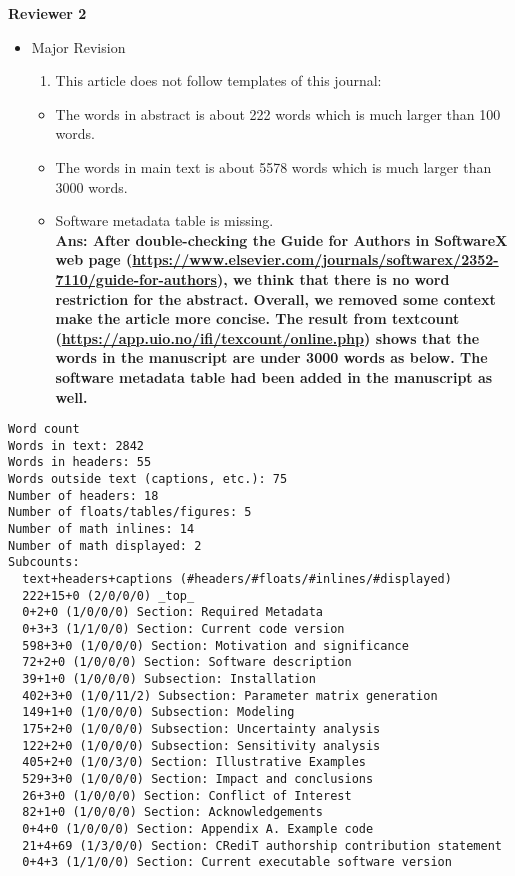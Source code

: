\documentclass[
]{article}
\providecommand{\tightlist}{%
  \setlength{\itemsep}{0pt}\setlength{\parskip}{0pt}}
\begin{document}
\textbf{Reviewer 2}

\begin{itemize}
\item
  Major Revision

  \begin{enumerate}
  \def\labelenumi{\arabic{enumi}.}
  \tightlist
  \item
    This article does not follow templates of this journal:
  \end{enumerate}

  \begin{itemize}
  \tightlist
  \item
    The words in abstract is about 222 words which is much larger than
    100 words.
  \item
    The words in main text is about 5578 words which is much larger than
    3000 words.
  \item
    Software metadata table is missing.\\
    \textbf{Ans: After double-checking the Guide for Authors in
    SoftwareX web page
    (\url{https://www.elsevier.com/journals/softwarex/2352-7110/guide-for-authors}),
    we think that there is no word restriction for the abstract.
    Overall, we removed some context make the article more concise. The
    result from textcount
    (\url{https://app.uio.no/ifi/texcount/online.php}) shows that the
    words in the manuscript are under 3000 words as below. The software
    metadata table had been added in the manuscript as well.}
  \end{itemize}
\end{itemize}

\begin{verbatim}
Word count
Words in text: 2842
Words in headers: 55
Words outside text (captions, etc.): 75
Number of headers: 18
Number of floats/tables/figures: 5
Number of math inlines: 14
Number of math displayed: 2
Subcounts:
  text+headers+captions (#headers/#floats/#inlines/#displayed)
  222+15+0 (2/0/0/0) _top_
  0+2+0 (1/0/0/0) Section: Required Metadata
  0+3+3 (1/1/0/0) Section: Current code version
  598+3+0 (1/0/0/0) Section: Motivation and significance
  72+2+0 (1/0/0/0) Section: Software description
  39+1+0 (1/0/0/0) Subsection: Installation
  402+3+0 (1/0/11/2) Subsection: Parameter matrix generation
  149+1+0 (1/0/0/0) Subsection: Modeling
  175+2+0 (1/0/0/0) Subsection: Uncertainty analysis
  122+2+0 (1/0/0/0) Subsection: Sensitivity analysis
  405+2+0 (1/0/3/0) Section: Illustrative Examples
  529+3+0 (1/0/0/0) Section: Impact and conclusions
  26+3+0 (1/0/0/0) Section: Conflict of Interest
  82+1+0 (1/0/0/0) Section: Acknowledgements
  0+4+0 (1/0/0/0) Section: Appendix A. Example code
  21+4+69 (1/3/0/0) Section: CRediT authorship contribution statement
  0+4+3 (1/1/0/0) Section: Current executable software version
\end{verbatim}
\end{document}
